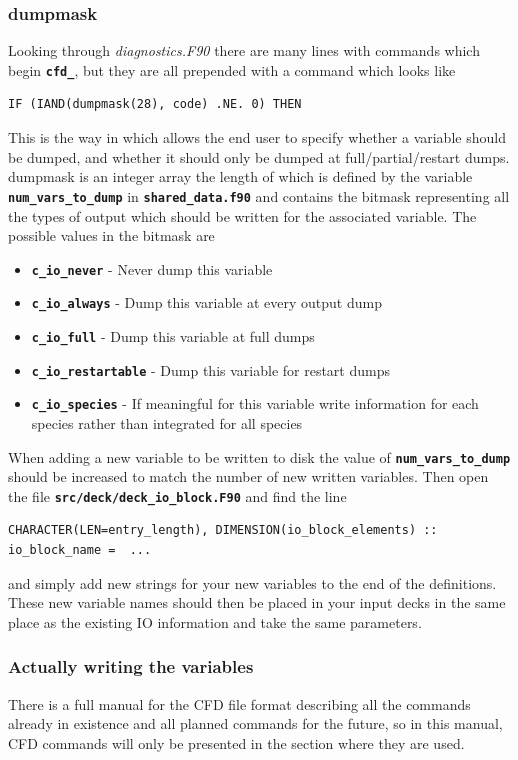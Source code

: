 \documentclass[12pt,a4paper]{article}
\newcommand{\simpleboxverbatim}{\begin{Verbatim}[obeytabs=true,frame=single,
  framerule=0.5mm,rulecolor=\color{warwickmid},formatcom=\color{black}]}
\newcommand{\inlinecode}[1]{{\color{warwickred} \bf\texttt{#1}}}
\newcommand{\EPOCH}{{\color{warwickdark}\fontfamily{phv}\selectfont{EPOCH}}}
\begin{document}
\subsubsection{dumpmask}
Looking through {\it diagnostics.F90} there are many lines with commands which
begin \inlinecode{cfd\_}, but they are all prepended with a command which looks
like
\simpleboxverbatim
  IF (IAND(dumpmask(28), code) .NE. 0) THEN
\end{Verbatim}
This is the way in which {\EPOCH} allows the end user to specify whether a
variable should be dumped, and whether it should only be dumped at
full/partial/restart dumps. dumpmask is an integer array the length of which is
defined by the variable \inlinecode{num\_vars\_to\_dump} in
\inlinecode{shared\_data.f90} and contains the bitmask representing all the
types of output which should be written for the associated variable. The
possible values in the bitmask are

\begin{itemize}
\item \inlinecode{c\_io\_never} - Never dump this variable
\item \inlinecode{c\_io\_always} - Dump this variable at every output dump
\item \inlinecode{c\_io\_full} - Dump this variable at full dumps
\item \inlinecode{c\_io\_restartable} - Dump this variable for restart dumps
\item \inlinecode{c\_io\_species} - If meaningful for this variable write
  information for each species rather than integrated for all species
\end{itemize}

When adding a new variable to be written to disk the value of
\inlinecode{num\_vars\_to\_dump} should be increased to match the number of new
written variables. Then open the file \inlinecode{src/deck/deck\_io\_block.F90}
and find the line
\simpleboxverbatim
  CHARACTER(LEN=entry_length), DIMENSION(io_block_elements) :: io_block_name =  ...
\end{Verbatim}

and simply add new strings for your new variables to the end of the
definitions. These new variable names should then be placed in your input decks
in the same place as the existing IO information and take the same parameters.

\subsubsection{Actually writing the variables}
There is a full manual for the CFD file format describing all the commands
already in existence and all planned commands for the future, so in this
manual, CFD commands will only be presented in the section where they are used.
\end{document}

